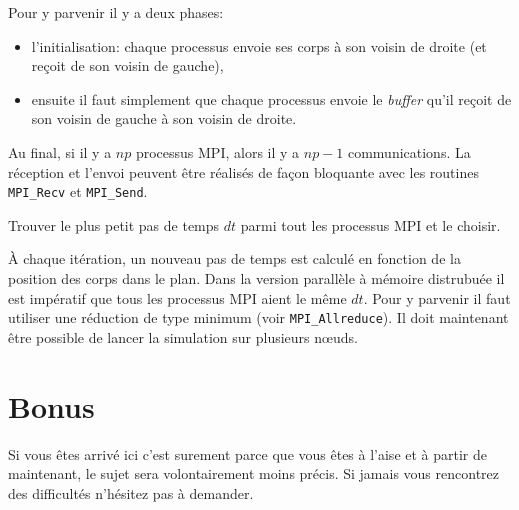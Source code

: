 \begin{questions}
\begin{solution}
		Pour y parvenir il y a deux phases:
		\begin{itemize}
			\item l'initialisation: chaque processus envoie ses corps à son voisin de droite (et reçoit de son voisin de gauche),
			\item ensuite il faut simplement que chaque processus envoie le \textit{buffer} qu'il reçoit de son voisin de gauche à son voisin de droite.
		\end{itemize}
		Au final, si il y a $np$ processus MPI, alors il y a $np-1$ communications.
		La réception et l'envoi peuvent être réalisés de façon bloquante avec les routines \texttt{MPI\_Recv} et \texttt{MPI\_Send}.
	\end{solution}
	\question Trouver le plus petit pas de temps $dt$ parmi tout les processus MPI et le choisir.
	\begin{solution}
		À chaque itération, un nouveau pas de temps est calculé en fonction de la position des corps dans le plan.
		Dans la version parallèle à mémoire distrubuée il est impératif que tous les processus MPI aient le même $dt$.
		Pour y parvenir il faut utiliser une réduction de type minimum (voir \texttt{MPI\_Allreduce}).
		Il doit maintenant être possible de lancer la simulation sur plusieurs n\oe uds.
	\end{solution}
\end{questions}

\section{Bonus}
Si vous êtes arrivé ici c'est surement parce que vous êtes à l'aise et à partir de maintenant, le sujet sera volontairement moins précis.
Si jamais vous rencontrez des difficultés n'hésitez pas à demander.\\


